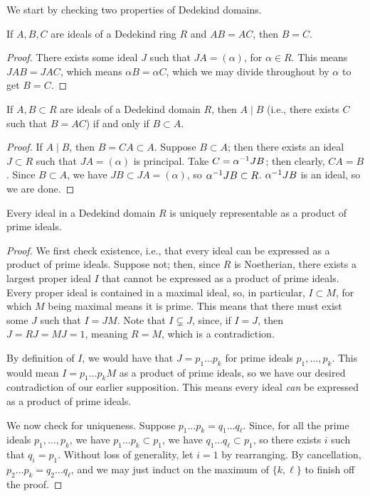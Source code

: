 We start by checking two properties of Dedekind domains.
\begin{proposition} \label{prop:dedekind_ideals_left_cancellation}
    If $A, B, C$ are ideals of a Dedekind ring $R$ and $AB = AC$, then $B = C$.
\end{proposition}
\begin{proof}
    There exists some ideal $J$ such that $J A = (\alpha)$, for $\alpha \in R$. This means $JAB = JAC$, which means $\alpha B = \alpha C$, which we may divide throughout by $\alpha$ to get $B = C$.
\end{proof}
\begin{proposition} \label{prop:dedekind_ideal_divisibility}
    If $A, B \subset R$ are ideals of a Dedekind domain $R$, then $A \mid B$ (i.e., there exists $C$ such that $B = AC$) if and only if $B \subset A$.
\end{proposition}
\begin{proof}
    If $A \mid B$, then $B = CA \subset A$. Suppose $B \subset A$; then there exists an ideal $J \subset R$ such that $J A = (\alpha)$ is principal. Take $C = \alpha^{-1} J B$; then clearly, $CA = B$. Since $B \subset A$, we have $JB \subset JA = (\alpha)$, so $\alpha^{-1} JB \subset R$. $\alpha^{-1} JB$ is an ideal, so we are done.
\end{proof}

\newpage
\begin{theorem} \label{thm:dedekind_unique_decomposition}
    Every ideal in a Dedekind domain $R$ is uniquely representable as a product of prime ideals.
\end{theorem}
\begin{proof}
    We first check existence, i.e., that every ideal can be expressed as a product of prime ideals. Suppose not; then, since $R$ is Noetherian, there exists a largest proper ideal $I$ that cannot be expressed as a product of prime ideals. Every proper ideal is contained in a maximal ideal, so, in particular, $I \subset M$, for which $M$ being maximal means it is prime. This means that there must exist some $J$ such that $I = J M$. Note that $I \subsetneq J$, since, if $I = J$, then $J = RJ = MJ = 1$, meaning $R = M$, which is a contradiction.

    By definition of $I$, we would have that $J = p_1 \dots p_k$ for prime ideals $p_1, \dots, p_k$. This would mean $I = p_1 \dots p_k M$ as a product of prime ideals, so we have our desired contradiction of our earlier supposition. This means every ideal \textit{can} be expressed as a product of prime ideals.

    We now check for uniqueness. Suppose $p_1 \dots p_k = q_1 \dots q_\ell$. Since, for all the prime ideals $p_1, \dots, p_k$, we have $p_1 \dots p_k \subset p_1$, we have $q_1 \dots q_\ell \subset p_1$, so there exists $i$ such that $q_i = p_1$. Without loss of generality, let $i = 1$ by rearranging. By cancellation, $p_2 \dots p_k = q_2 \dots q_\ell$, and we may just induct on the maximum of $\{k, \ell\}$ to finish off the proof.
\end{proof}

